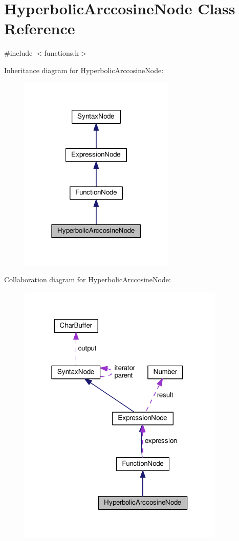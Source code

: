 \hypertarget{classHyperbolicArccosineNode}{}\section{Hyperbolic\+Arccosine\+Node Class Reference}
\label{classHyperbolicArccosineNode}


{\ttfamily \#include $<$functions.\+h$>$}



Inheritance diagram for Hyperbolic\+Arccosine\+Node\+:
\nopagebreak
\begin{figure}[H]
\begin{center}
\leavevmode
\includegraphics[width=210pt]{d3/ded/classHyperbolicArccosineNode__inherit__graph}
\end{center}
\end{figure}


Collaboration diagram for Hyperbolic\+Arccosine\+Node\+:
\nopagebreak
\begin{figure}[H]
\begin{center}
\leavevmode
\includegraphics[width=279pt]{da/dc2/classHyperbolicArccosineNode__coll__graph}
\end{center}
\end{figure}
